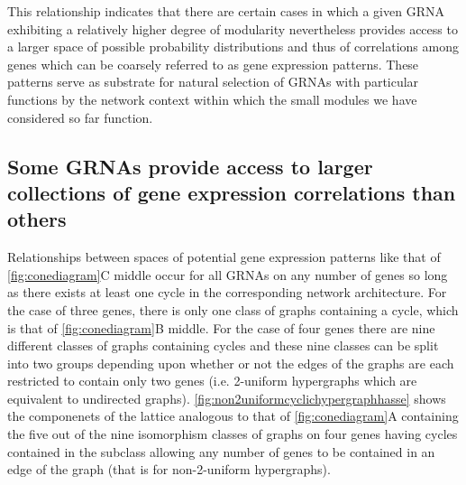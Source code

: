 This relationship indicates that there are certain cases in which a given GRNA exhibiting a relatively higher degree of modularity nevertheless provides access to a larger space of possible probability distributions and thus of correlations among genes which can be coarsely referred to as gene expression patterns. These patterns serve as substrate for natural selection of GRNAs with particular functions by the network context within which the small modules we have considered so far function.

\subsection{Some GRNAs provide access to larger collections of gene expression correlations than others}
Relationships between spaces of potential gene expression patterns like that of \ref{fig:conediagram}C middle occur for all GRNAs on any number of genes so long as there exists at least one cycle in the corresponding network architecture. For the case of three genes, there is only one class of graphs containing a cycle, which is that of \ref{fig:conediagram}B middle. For the case of four genes there are nine different classes of graphs containing cycles and these nine classes can be split into two groups depending upon whether or not the edges of the graphs are each restricted to contain only two genes (i.e. 2-uniform hypergraphs which are equivalent to undirected graphs). \ref{fig:non2uniformcyclichypergraphhasse} shows the componenets of the lattice analogous to that of \ref{fig:conediagram}A containing the five out of the nine isomorphism classes of graphs on four genes having cycles contained in the subclass allowing any number of genes to be contained in an edge of the graph (that is for non-2-uniform hypergraphs).

